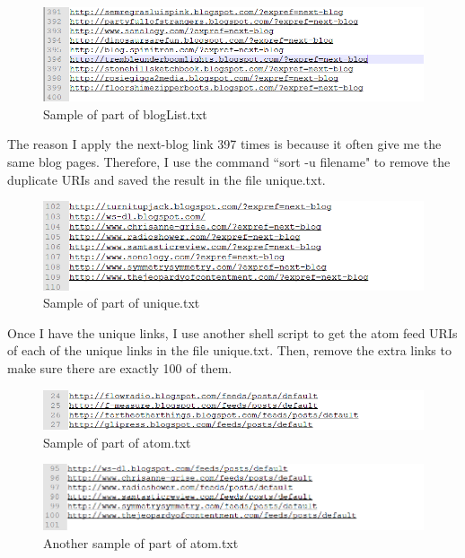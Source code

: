 \documentclass[12pt]{article}
\begin{document}
\begin{figure}[h]
\centering
\includegraphics[width=6.5in]{blogList.png}
\caption{Sample of part of blogList.txt}
\end{figure}



The reason I apply the next-blog link 397 times is because it often give me the same blog pages. Therefore, I use the command ``sort -u filename" to remove the duplicate URIs and saved the result in the file unique.txt. 

\begin{figure}[h]
\centering
\includegraphics[width=6.5in]{unique.png}
\caption{Sample of part of unique.txt}
\end{figure}

Once I have the unique links, I use another shell script to get the atom feed URIs of each of the unique links in the file unique.txt. Then, remove the extra links to make sure there are exactly 100 of them.

\begin{figure}[h]
\centering
\includegraphics[width=6.5in]{atomf.png}
\caption{Sample of part of atom.txt}
\end{figure}
\begin{figure}[h]
\centering
\includegraphics[width=6.5in]{atomm.png}
\caption{Another sample of part of atom.txt}
\end{figure}
\end{document}
